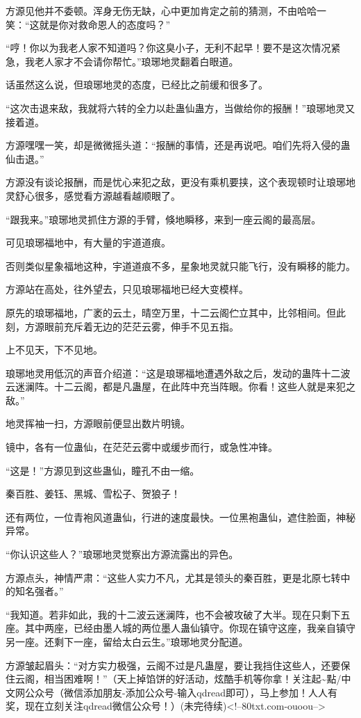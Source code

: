 \begin{this_body}
方源见他并不委顿。浑身无伤无缺，心中更加肯定之前的猜测，不由哈哈一笑：“这就是你对救命恩人的态度吗？”

“哼！你以为我老人家不知道吗？你这臭小子，无利不起早！要不是这次情况紧急，我老人家才不会请你帮忙。”琅琊地灵翻着白眼道。

话虽然这么说，但琅琊地灵的态度，已经比之前缓和很多了。

“这次击退来敌，我就将六转的全力以赴蛊仙蛊方，当做给你的报酬！”琅琊地灵又接着道。

方源嘿嘿一笑，却是微微摇头道：“报酬的事情，还是再说吧。咱们先将入侵的蛊仙击退。”

方源没有谈论报酬，而是忧心来犯之敌，更没有乘机要挟，这个表现顿时让琅琊地灵舒心很多，感觉看方源越看越顺眼了。

“跟我来。”琅琊地灵抓住方源的手臂，倏地瞬移，来到一座云阁的最高层。

可见琅琊福地中，有大量的宇道道痕。

否则类似星象福地这种，宇道道痕不多，星象地灵就只能飞行，没有瞬移的能力。

方源站在高处，往外望去，只见琅琊福地已经大变模样。

原先的琅琊福地，广袤的云土，晴空万里，十二云阁伫立其中，比邻相间。但此刻，方源眼前充斥着无边的茫茫云雾，伸手不见五指。

上不见天，下不见地。

琅琊地灵用低沉的声音介绍道：“这是琅琊福地遭遇外敌之后，发动的蛊阵十二波云迷澜阵。十二云阁，都是凡蛊屋，在此阵中充当阵眼。你看！这些人就是来犯之敌。”

地灵挥袖一扫，方源眼前便显出数片明镜。

镜中，各有一位蛊仙，在茫茫云雾中或缓步而行，或急性冲锋。

“这是！”方源见到这些蛊仙，瞳孔不由一缩。

秦百胜、姜钰、黑城、雪松子、贺狼子！

还有两位，一位青袍风道蛊仙，行进的速度最快。一位黑袍蛊仙，遮住脸面，神秘异常。

“你认识这些人？”琅琊地灵觉察出方源流露出的异色。

方源点头，神情严肃：“这些人实力不凡，尤其是领头的秦百胜，更是北原七转中的知名强者。”

“我知道。若非如此，我的十二波云迷澜阵，也不会被攻破了大半。现在只剩下五座。其中两座，已经由墨人城的两位墨人蛊仙镇守。你现在镇守这座，我亲自镇守另一座。还剩下一座，留给太白云生。”琅琊地灵分配道。

方源皱起眉头：“对方实力极强，云阁不过是凡蛊屋，要让我挡住这些人，还要保住云阁，相当困难啊！”（天上掉馅饼的好活动，炫酷手机等你拿！关注起\~{}點/中文网公众号（微信添加朋友-添加公众号-输入qdread即可），马上参加！人人有奖，现在立刻关注qdread微信公众号！）(未完待续)<!--80txt.com-ouoou-->

\end{this_body}

